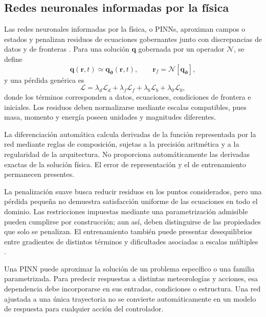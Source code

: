 \subsection{Redes neuronales informadas por la física}
\label{subsec:pinn}

Las redes neuronales informadas por la física, o PINNs, aproximan campos o estados y penalizan residuos de ecuaciones gobernantes junto con discrepancias de datos y de fronteras \cite{raissi2019}. Para una solución $\mathbf q$ gobernada por un operador $\mathcal N$, se define
\begin{equation}
\mathbf q(\mathbf r,t)\simeq\mathbf q_{\boldsymbol\vartheta}(\mathbf r,t),
\qquad
\mathbf r_f=\mathcal N[\mathbf q_{\boldsymbol\vartheta}],
\label{eq:pde_general}
\end{equation}
y una pérdida genérica es
\begin{equation}
\mathcal L=\lambda_d\mathcal L_d
+\lambda_f\mathcal L_f+\lambda_b\mathcal L_b
+\lambda_0\mathcal L_0,
\label{eq:loss_total}
\end{equation}
donde los términos corresponden a datos, ecuaciones, condiciones de frontera e iniciales. Los residuos deben normalizarse mediante escalas compatibles, pues masa, momento y energía poseen unidades y magnitudes diferentes.

La diferenciación automática calcula derivadas de la función representada por la red mediante reglas de composición, sujetas a la precisión aritmética y a la regularidad de la arquitectura. No proporciona automáticamente las derivadas exactas de la solución física. El error de representación y el de entrenamiento permanecen presentes.

La penalización suave busca reducir residuos en los puntos considerados, pero una pérdida pequeña no demuestra satisfacción uniforme de las ecuaciones en todo el dominio. Las restricciones impuestas mediante una parametrización admisible pueden cumplirse por construcción; aun así, deben distinguirse de las propiedades que solo se penalizan. El entrenamiento también puede presentar desequilibrios entre gradientes de distintos términos y dificultades asociadas a escalas múltiples \cite{wang2021}.

Una PINN puede aproximar la solución de un problema específico o una familia parametrizada. Para predecir respuestas a distintas meteorologías y acciones, esa dependencia debe incorporarse en sus entradas, condiciones o estructura. Una red ajustada a una única trayectoria no se convierte automáticamente en un modelo de respuesta para cualquier acción del controlador.

